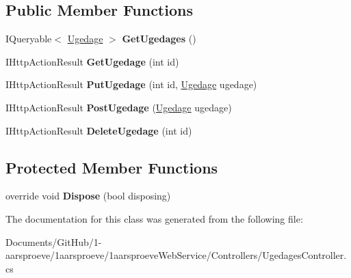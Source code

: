 \subsection*{Public Member Functions}
\begin{DoxyCompactItemize}
\item 
\hypertarget{class__1aarsproeve_web_service_1_1_controllers_1_1_ugedages_controller_a98d50da20a714c38d2a717f076655887}{}I\+Queryable$<$ \hyperlink{class__1aarsproeve_web_service_1_1_ugedage}{Ugedage} $>$ {\bfseries Get\+Ugedages} ()\label{class__1aarsproeve_web_service_1_1_controllers_1_1_ugedages_controller_a98d50da20a714c38d2a717f076655887}

\item 
\hypertarget{class__1aarsproeve_web_service_1_1_controllers_1_1_ugedages_controller_a4db2e98168016dcea0df32363641a42c}{}I\+Http\+Action\+Result {\bfseries Get\+Ugedage} (int id)\label{class__1aarsproeve_web_service_1_1_controllers_1_1_ugedages_controller_a4db2e98168016dcea0df32363641a42c}

\item 
\hypertarget{class__1aarsproeve_web_service_1_1_controllers_1_1_ugedages_controller_a6948a0ade30d7403d23a9e65fd95a239}{}I\+Http\+Action\+Result {\bfseries Put\+Ugedage} (int id, \hyperlink{class__1aarsproeve_web_service_1_1_ugedage}{Ugedage} ugedage)\label{class__1aarsproeve_web_service_1_1_controllers_1_1_ugedages_controller_a6948a0ade30d7403d23a9e65fd95a239}

\item 
\hypertarget{class__1aarsproeve_web_service_1_1_controllers_1_1_ugedages_controller_a67e223a57a8b55a0ae77e325eb4088e7}{}I\+Http\+Action\+Result {\bfseries Post\+Ugedage} (\hyperlink{class__1aarsproeve_web_service_1_1_ugedage}{Ugedage} ugedage)\label{class__1aarsproeve_web_service_1_1_controllers_1_1_ugedages_controller_a67e223a57a8b55a0ae77e325eb4088e7}

\item 
\hypertarget{class__1aarsproeve_web_service_1_1_controllers_1_1_ugedages_controller_a01b0fcb66e3675afd3781fa98275bc3f}{}I\+Http\+Action\+Result {\bfseries Delete\+Ugedage} (int id)\label{class__1aarsproeve_web_service_1_1_controllers_1_1_ugedages_controller_a01b0fcb66e3675afd3781fa98275bc3f}

\end{DoxyCompactItemize}
\subsection*{Protected Member Functions}
\begin{DoxyCompactItemize}
\item 
\hypertarget{class__1aarsproeve_web_service_1_1_controllers_1_1_ugedages_controller_a689da6fc697bd8ef8ec979a4f63ae9df}{}override void {\bfseries Dispose} (bool disposing)\label{class__1aarsproeve_web_service_1_1_controllers_1_1_ugedages_controller_a689da6fc697bd8ef8ec979a4f63ae9df}

\end{DoxyCompactItemize}


The documentation for this class was generated from the following file\+:\begin{DoxyCompactItemize}
\item 
Documents/\+Git\+Hub/1-\/aarsproeve/1aarsproeve/1aarsproeve\+Web\+Service/\+Controllers/Ugedages\+Controller.\+cs\end{DoxyCompactItemize}
